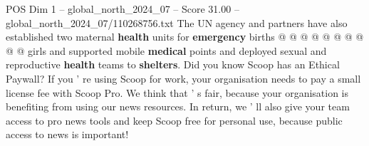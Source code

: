 \begin{textsample}{POS Dim 1 – global\_north\_2024\_07 – Score 31.00 – global\_north\_2024\_07/110268756.txt}
The UN agency and partners have also established two maternal \textbf{health} units for \textbf{emergency} births @ @ @ @ @ @ @ @ @ @ girls and supported mobile \textbf{medical} points and deployed sexual and reproductive \textbf{health} teams to \textbf{shelters}.
Did you know Scoop has an Ethical Paywall?
If you ' re using Scoop for work, your organisation needs to pay a small license fee with Scoop Pro.
We think that ' s fair, because your organisation is benefiting from using our news resources.
In return, we ' ll also give your team access to pro news tools and keep Scoop free for personal use, because public access to news is important!

\end{textsample}
